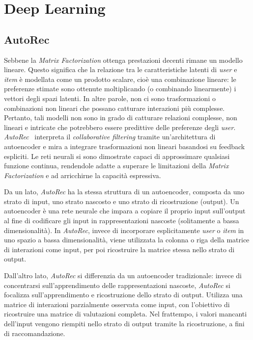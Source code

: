 \section{Deep Learning}

\subsection{AutoRec}\label{autorec}
Sebbene la \textit{Matrix Factorization} ottenga prestazioni decenti rimane un modello lineare. Questo significa che la relazione tra le caratteristiche latenti di \textit{user} e \textit{item} è modellata come un prodotto scalare, cioè una combinazione lineare: le preferenze stimate sono ottenute moltiplicando (o combinando linearmente) i vettori degli spazi latenti. In altre parole, non ci sono trasformazioni o combinazioni non lineari che possano catturare interazioni più complesse. Pertanto, tali modelli non sono in grado di catturare relazioni complesse, non lineari e intricate che potrebbero essere predittive delle preferenze degli \textit{user}. \textit{AutoRec}~\cite{AutoRec} interpreta il \textit{collaborative filtering} tramite un'architettura di autoencoder e mira a integrare trasformazioni non lineari basandosi su feedback espliciti. Le reti neurali si sono dimostrate capaci di approssimare qualsiasi funzione continua, rendendole adatte a superare le limitazioni della \textit{Matrix Factorization} e ad arricchirne la capacità espressiva.

Da un lato, \textit{AutoRec} ha la stessa struttura di un autoencoder, composta da uno strato di input, uno strato nascosto e uno strato di ricostruzione (output). Un autoencoder è una rete neurale che impara a copiare il proprio input sull'output al fine di codificare gli input in rappresentazioni nascoste (solitamente a bassa dimensionalità). In \textit{AutoRec}, invece di incorporare esplicitamente \textit{user} o \textit{item} in uno spazio a bassa dimensionalità, viene utilizzata la colonna o riga della matrice di interazioni come input, per poi ricostruire la matrice stessa nello strato di output.

Dall'altro lato, \textit{AutoRec} si differenzia da un autoencoder tradizionale: invece di concentrarsi sull'apprendimento delle rappresentazioni nascoste, \textit{AutoRec} si focalizza sull'apprendimento e ricostruzione dello strato di output. Utilizza una matrice di interazioni parzialmente osservata come input, con l'obiettivo di ricostruire una matrice di valutazioni completa. Nel frattempo, i valori mancanti dell'input vengono riempiti nello strato di output tramite la ricostruzione, a fini di raccomandazione.


